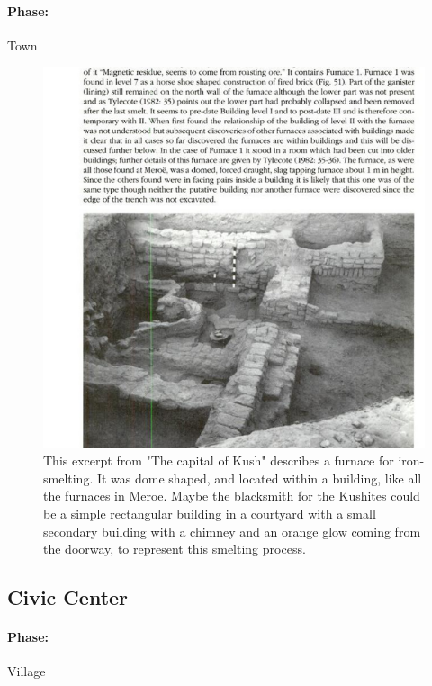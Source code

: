 \documentclass[a4paper,12pt]{scrreprt}
\begin{document}
\paragraph{Phase:} Town\\

\begin{figure}[H]
	\centering
	\includegraphics[width=\textwidth]{img/blacksmith/blacksmith_layout}
	\caption{This excerpt from "The capital of Kush" describes a furnace for iron-smelting. It was dome shaped, and located within a building, like all the furnaces in Meroe. Maybe the blacksmith for the Kushites could be a simple rectangular building in a courtyard with a small secondary building with a chimney and an orange glow coming from the doorway, to represent this smelting process.  }
\end{figure}

\subsection{Civic Center}

\paragraph{Phase:} Village\\
\end{document}
